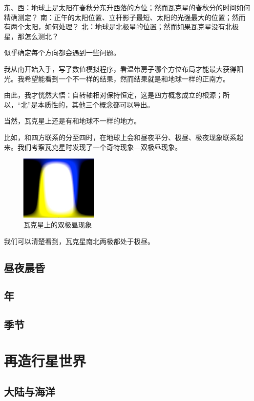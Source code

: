 \documentclass[a4paper,10.5pt]{article}
\begin{document}
东、西：地球上是太阳在春秋分东升西落的方位；然而瓦克星的春秋分的时间如何精确测定？
南：正午的太阳位置、立杆影子最短、太阳的光强最大的位置；然而有两个太阳，如何处理？
北：地球是北极星的位置；然而如果瓦克星没有北极星，那怎么测北？

似乎确定每个方向都会遇到一些问题。

我从南开始入手，写了数值模拟程序，看温带房子哪个方位布局才能最大获得阳光。我希望能看到一个不一样的结果，然而结果就是和地球一样的正南方。

由此，我才恍然大悟：自转轴相对保持恒定，这是四方概念成立的根源；所以，“北”是本质性的，其他三个概念都可以导出。

当然，瓦克星上还是有和地球不一样的地方。

比如，和四方联系的分至四时，在地球上会和昼夜平分、极昼、极夜现象联系起来。我们考察瓦克星时发现了一个奇特现象—双极昼现象。

\begin{figure}[ht]
\centering
\includegraphics[width=1.5in]{images/4_02-day-night.png}
\caption{瓦克星上的双极昼现象}
\end{figure}

我们可以清楚看到，瓦克星南北两极都处于极昼。

\subsection{昼夜晨昏}

\subsection{年}

\subsection{季节}

\section{再造行星世界}

\subsection{大陆与海洋}
\end{document}
